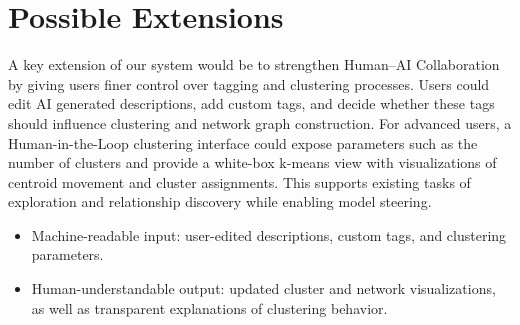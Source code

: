 \documentclass{article}
\begin{document}
\section{Possible Extensions}
A key extension of our system would be to strengthen Human–AI Collaboration by giving users finer control over tagging and clustering processes. Users could edit AI generated descriptions, add custom tags, and decide whether these tags should influence clustering and network graph construction. For advanced users, a Human-in-the-Loop clustering interface could expose parameters such as the number of clusters and provide a white-box k-means view with visualizations of centroid movement and cluster assignments. This supports existing tasks of exploration and relationship discovery while enabling model steering. 
\begin{itemize}
\item Machine-readable input: user-edited descriptions, custom tags, and clustering parameters.\\
\item Human-understandable output: updated cluster and network visualizations, as well as transparent explanations of clustering behavior.

    
\end{itemize}
\end{document}
